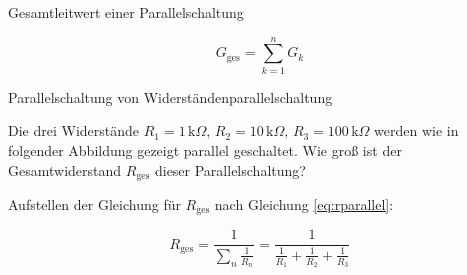\begin{frame}
{	\begin{Merksatz}{Gesamtleitwert einer Parallelschaltung}

		\begin{equation}
			G_\mathrm{ges} = \sum_{k=1}^{n} G_k 
		\end{equation}
	\end{Merksatz}

	\begin{bsp}{Parallelschaltung von Widerständen}{parallelschaltung}

		Die drei Widerstände $R_1 = 1 \, \mathrm{k}\Omega$, $R_2 = 10 \, \mathrm{k}\Omega$, $R_3 = 100 \, \mathrm{k}\Omega$
		werden wie in folgender Abbildung gezeigt parallel geschaltet. Wie groß ist der Gesamtwiderstand $R_\mathrm{ges}$ dieser 
		Parallelschaltung?


		\begin{center}
				
			
			
	


			\end{center}

			Aufstellen der Gleichung für $R_\mathrm{ges}$ nach Gleichung \ref{eq:rparallel}:



			\begin{equation*}
				R_\mathrm{ges} = \frac{1}{\sum_{n} \frac{1}{R_n}} = \frac{1}{\frac{1}{R_1} + \frac{1}{R_2}+ \frac{1}{R_3}}
			\end{equation*}


\end{bsp}}
\end{frame}
